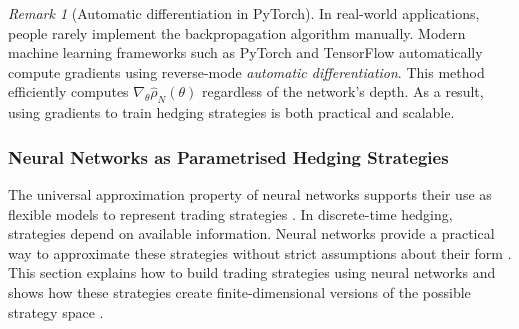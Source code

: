 \documentclass[12pt,a4paper]{article}
\theoremstyle{definition}
\theoremstyle{plain}
\theoremstyle{remark}
\newtheorem{remark}{Remark}[section]
\theoremstyle{plain}
\begin{document}
\begin{remark}[Automatic differentiation in PyTorch]\label{rem:auto_diff}
In real-world applications, people rarely implement the backpropagation algorithm manually.
Modern machine learning frameworks such as PyTorch and TensorFlow automatically compute gradients using reverse-mode \emph{automatic differentiation}. This method efficiently computes $\nabla_{\theta}\widehat{\rho}_N(\theta)$ regardless of the network's depth.
As a result, using gradients to train hedging strategies is both practical and scalable.
\end{remark}

\subsubsection{Neural Networks as Parametrised Hedging Strategies}
The universal approximation property of neural networks supports their use as flexible models to represent trading strategies \cite{Hornik1991,HighamHigham2019DeepLearning}. 
In discrete-time hedging, strategies depend on available information. Neural networks provide a practical way to approximate these strategies without strict assumptions about their form \cite{Buehler2019DeepHedging,Horvath2021DeepRough}. 
This section explains how to build trading strategies using neural networks and shows how these strategies create finite-dimensional versions of the possible strategy space \cite{Buehler2019DeepHedging}.
\end{document}
